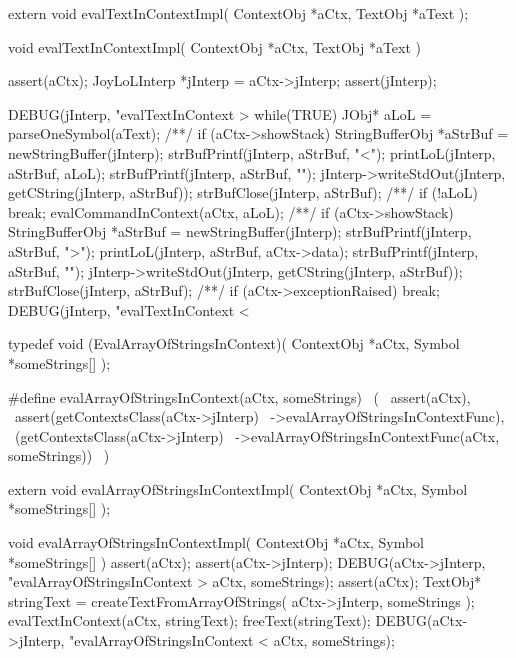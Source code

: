 \startCHeader
extern void evalTextInContextImpl(
  ContextObj *aCtx,
  TextObj    *aText
);
\stopCHeader
{}

\startCCode
void evalTextInContextImpl(
  ContextObj *aCtx,
  TextObj    *aText
) {
  assert(aCtx);
  JoyLoLInterp *jInterp = aCtx->jInterp;
  assert(jInterp);

  DEBUG(jInterp, "evalTextInContext > %
  while(TRUE) {
    JObj* aLoL = parseOneSymbol(aText);
/**/    if (aCtx->showStack) {
      StringBufferObj *aStrBuf =
        newStringBuffer(jInterp);
      strBufPrintf(jInterp, aStrBuf, "<");
      printLoL(jInterp, aStrBuf, aLoL);
      strBufPrintf(jInterp, aStrBuf, "\n");
      jInterp->writeStdOut(jInterp, getCString(jInterp, aStrBuf));
      strBufClose(jInterp, aStrBuf);
    } /**/
    if (!aLoL) break;
    evalCommandInContext(aCtx, aLoL);
/**/    if (aCtx->showStack) {
      StringBufferObj *aStrBuf =
        newStringBuffer(jInterp);
      strBufPrintf(jInterp, aStrBuf, ">");
      printLoL(jInterp, aStrBuf, aCtx->data);
      strBufPrintf(jInterp, aStrBuf, "\n");
      jInterp->writeStdOut(jInterp, getCString(jInterp, aStrBuf));
      strBufClose(jInterp, aStrBuf);
    } /**/
    if (aCtx->exceptionRaised) break;
  }
  DEBUG(jInterp, "evalTextInContext < %
}
\stopCCode

\startCHeader
typedef void (EvalArrayOfStringsInContext)(
  ContextObj *aCtx,
  Symbol     *someStrings[]
);

#define evalArrayOfStringsInContext(aCtx, someStrings)      \
  (                                                         \
    assert(aCtx),                                           \
    assert(getContextsClass(aCtx->jInterp)                  \
      ->evalArrayOfStringsInContextFunc),                   \
    (getContextsClass(aCtx->jInterp)                        \
      ->evalArrayOfStringsInContextFunc(aCtx, someStrings)) \
  )
\stopCHeader

\setCHeaderStream{private}
\startCHeader
extern void evalArrayOfStringsInContextImpl(
  ContextObj *aCtx,
  Symbol     *someStrings[]
);
\stopCHeader
\setCHeaderStream{public}

\startCCode
void evalArrayOfStringsInContextImpl(
  ContextObj *aCtx,
  Symbol     *someStrings[]
) {
  assert(aCtx);
  assert(aCtx->jInterp);
  DEBUG(aCtx->jInterp, "evalArrayOfStringsInContext > %
    aCtx, someStrings);
  assert(aCtx);
  TextObj* stringText =
    createTextFromArrayOfStrings(
      aCtx->jInterp,
      someStrings
    );
  evalTextInContext(aCtx, stringText);
  freeText(stringText);
  DEBUG(aCtx->jInterp, "evalArrayOfStringsInContext < %
    aCtx, someStrings);
}
\stopCCode

